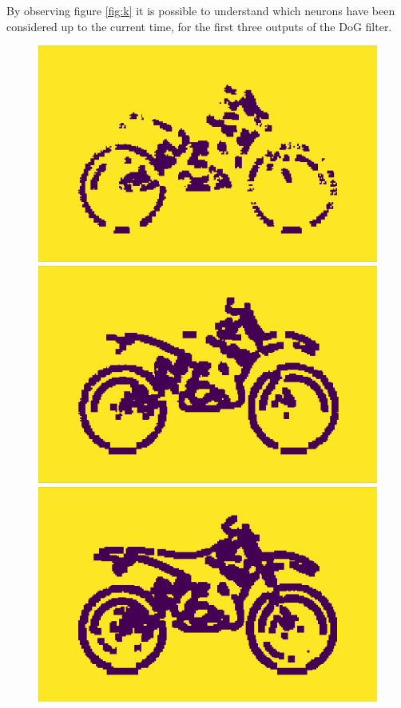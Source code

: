 \documentclass[11pt,a4paper]{scrartcl}
\begin{document}
\newpage
By observing figure \ref{fig:k} it is possible to understand which neurons have been considered up to the current time, for the first three outputs of the DoG filter.\\
\begin{figure}[!h]
	\centering
	\begin{minipage}[b]{0.32\textwidth}
		\includegraphics[width=\textwidth]{images/K_1}
	\end{minipage}
	\hfill
	\begin{minipage}[b]{0.32\textwidth}
		\includegraphics[width=\textwidth]{images/K_2}
	\end{minipage}
	\hfill
	\begin{minipage}[b]{0.32\textwidth}
		\includegraphics[width=\textwidth]{images/K_3}

\end{minipage}
\end{figure}
\end{document}
